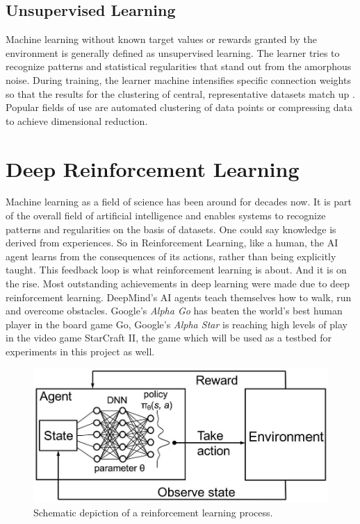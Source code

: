 \documentclass[12pt,a4paper]{article}
\begin{document}
\subsection{Unsupervised Learning}
Machine learning without known target values or rewards granted by the environment is generally defined as unsupervised learning. The learner tries to recognize patterns and statistical regularities that stand out from the amorphous noise. During training, the learner machine intensifies specific connection weights so that the results for the clustering of central, representative datasets match up \cite{Patterson1997}. Popular fields of use are automated clustering of data points or compressing data to achieve dimensional reduction.
\section{Deep Reinforcement Learning}
Machine learning as a field of science has been around for decades now. It is part of the overall field of artificial intelligence and enables systems to recognize patterns and regularities on the basis of datasets.
One could say knowledge is derived from experiences. So in Reinforcement Learning, like a human, the AI agent learns from the consequences of its actions, rather than being explicitly taught. This feedback loop is what reinforcement learning is about.
And it is on the rise. Most outstanding achievements in deep learning were made due to deep reinforcement learning. DeepMind's AI agents teach themselves how to walk, run and overcome obstacles.
Google's {\it Alpha Go} has beaten the world's best human player in the board game Go, Google's {\it Alpha Star} is reaching high levels of play in the
video game StarCraft II, the game which will be used as a testbed for experiments in this project as well.
\newline
\begin{figure}
    \centering
    \includegraphics[width={0.5\linewidth}]{Figures/DRL_schemantic_depiction.jpeg}
    \caption{Schematic depiction of a reinforcement learning process.}
    \label{fig:drl_schemantic}
\end{figure}
\end{document}
